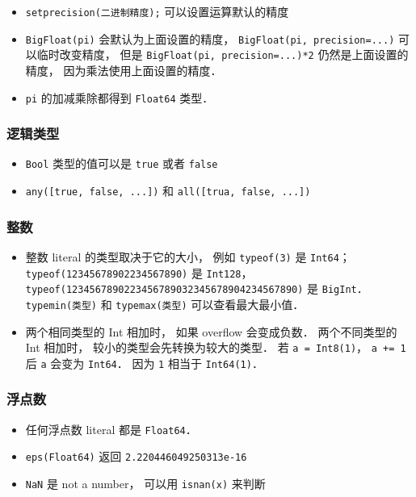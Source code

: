 \begin{itemize}
\item \verb|setprecision(二进制精度);| 可以设置运算默认的精度
\item \verb|BigFloat(pi)| 会默认为上面设置的精度， \verb|BigFloat(pi, precision=...)| 可以临时改变精度， 但是 \verb|BigFloat(pi, precision=...)*2| 仍然是上面设置的精度， 因为乘法使用上面设置的精度．
\item \verb|pi| 的加减乘除都得到 \verb|Float64| 类型．
\end{itemize}


\subsubsection{逻辑类型}
\begin{itemize}
\item \verb|Bool| 类型的值可以是 \verb|true| 或者 \verb|false|
\item \verb|any([true, false, ...])| 和 \verb|all([trua, false, ...])|
\end{itemize}

\subsubsection{整数}
\begin{itemize}
\item 整数 literal 的类型取决于它的大小， 例如 \verb|typeof(3)| 是 \verb|Int64|； \verb|typeof(12345678902234567890)| 是 \verb|Int128|， \verb|typeof(1234567890223456789032345678904234567890)| 是 \verb|BigInt|． \verb|typemin(类型)| 和 \verb|typemax(类型)| 可以查看最大最小值．
\item 两个相同类型的 Int 相加时， 如果 overflow 会变成负数． 两个不同类型的 Int 相加时， 较小的类型会先转换为较大的类型． 若 \verb|a = Int8(1)|， \verb|a += 1| 后 \verb|a| 会变为 \verb|Int64|． 因为 \verb|1| 相当于 \verb|Int64(1)|．
\end{itemize}

\subsubsection{浮点数}
\begin{itemize}
\item 任何浮点数 literal 都是 \verb|Float64|．
\item \verb|eps(Float64)| 返回 \verb|2.220446049250313e-16|
\item \verb|NaN| 是 not a number， 可以用 \verb|isnan(x)| 来判断
\end{itemize}

